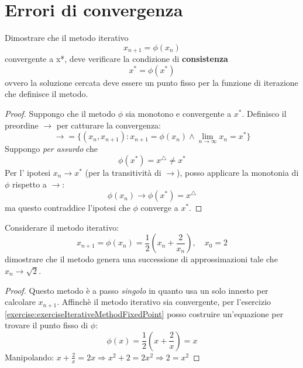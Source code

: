 \section{Errori di convergenza}

\begin{exercise}[1.3] 
\label{exercise:exerciseIterativeMethodFixedPoint}
Dimostrare che il metodo iterativo $$x_{n+1}=\phi(x_{n})$$ convergente a x*,
deve verificare la condizione di \textbf{consistenza} $$x^{*}=\phi(x^{*})$$
ovvero la soluzione cercata deve essere un punto fisso per la funzione di
iterazione che definisce il metodo.
\end{exercise}
\begin{proof}
Suppongo che il metodo $\phi$ sia monotono e convergente a $x^{*}$. Definisco
il preordine $\rightarrow$ per catturare la convergenza:
\begin{displaymath}
\rightarrow = \lbrace (x_{n}, x_{n+1}) : x_{n+1} = \phi(x_{n}) \wedge \lim_{n
\rightarrow \infty}{x_{n}} = x^{*}
\rbrace
\end{displaymath}
Suppongo \emph{per assurdo} che $$\phi(x^{*}) = x^{\triangle} \not = x^{*}$$
Per l' ipotesi $x_{n} \rightarrow x^{*}$ (per la transitivit\`a di
$\rightarrow$), posso applicare la monotonia di $\phi$ rispetto a $\rightarrow$:
$$\phi(x_{n}) \rightarrow \phi(x^{*}) = x^{\triangle}$$ ma questo contraddice 
l'ipotesi che $\phi$ converge a $x^{*}$.
\end{proof}

\begin{exercise}
Considerare il metodo iterativo:
\begin{displaymath}
	x_{n+1} = \phi(x_{n}) = \frac{1}{2} \left ( x_{n} + \frac{2}{x_{n}} \right ), 
		\quad x_{0} = 2
\end{displaymath}
dimostrare che il metodo genera una successione di approssimazioni tale che 
$x_{n} \rightarrow \sqrt{2}$.
\end{exercise}
\begin{proof}
Questo metodo \`e a passo \emph{singolo} in quanto usa un solo innesto per calcolare
$x_{n + 1}$.
Affinch\`e il metodo iterativo sia convergente, per l'esercizio 
\ref{exercise:exerciseIterativeMethodFixedPoint} posso costruire
un'equazione per trovare il punto fisso di $\phi$:
\begin{displaymath}
\phi(x) = \frac{1}{2} \left ( x + \frac{2}{x} \right ) = x
\end{displaymath}
Manipolando: $x + \frac{2}{x} = 2x \Rightarrow x^{2} + 2 = 2x^{2} \Rightarrow 
	2 = x^{2}$
\end{proof}

